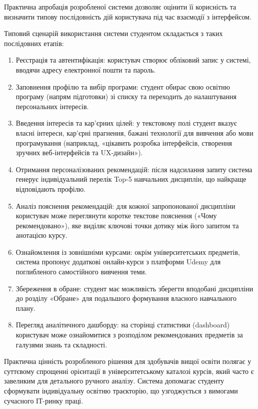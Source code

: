 \documentclass[
]{article}
\begin{document}
Практична апробація розробленої системи дозволяє оцінити її корисність
та визначити типову послідовність дій користувача під час взаємодії з
інтерфейсом.

Типовий сценарій використання системи студентом складається з таких
послідовних етапів:

\begin{enumerate}
\def\labelenumi{\arabic{enumi}.}
\item
  Реєстрація та автентифікація: користувач створює обліковий запис у
  системі, вводячи адресу електронної пошти та пароль.
\item
  Заповнення профілю та вибір програми: студент обирає свою освітню
  програму (напрям підготовки) зі списку та переходить до налаштування
  персональних інтересів.
\item
  Введення інтересів та кар'єрних цілей: у текстовому полі студент
  вказує власні інтереси, кар'єрні прагнення, бажані технології для
  вивчення або мови програмування (наприклад, «цікавить розробка
  інтерфейсів, створення зручних веб-інтерфейсів та UX-дизайн»).
\item
  Отримання персоналізованих рекомендацій: після надсилання запиту
  система генерує індивідуальний перелік Top-5 навчальних дисциплін, що
  найкраще відповідають профілю.
\item
  Аналіз пояснення рекомендацій: для кожної запропонованої дисципліни
  користувач може переглянути коротке текстове пояснення («Чому
  рекомендовано»), яке виділяє ключові точки дотику між його запитом та
  анотацією курсу.
\item
  Ознайомлення із зовнішніми курсами: окрім університетських предметів,
  система пропонує додаткові онлайн-курси з платформи Udemy для
  поглибленого самостійного вивчення теми.
\item
  Збереження в обране: студент має можливість зберегти вподобані
  дисципліни до розділу «Обране» для подальшого формування власного
  навчального плану.
\item
  Перегляд аналітичного дашборду: на сторінці статистики (dashboard)
  користувач може ознайомитися з розподілом рекомендованих предметів за
  галузями знань та складності.
\end{enumerate}

Практична цінність розробленого рішення для здобувачів вищої освіти
полягає у суттєвому спрощенні орієнтації в університетському каталозі
курсів, який часто є завеликим для детального ручного аналізу. Система
допомагає студенту сформувати індивідуальну освітню траєкторію, що
узгоджується з вимогами сучасного ІТ-ринку праці.
\end{document}
